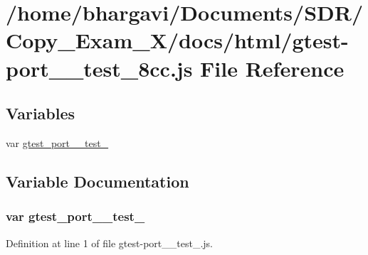 \hypertarget{gtest-port____test__8cc_8js}{}\section{/home/bhargavi/\+Documents/\+S\+D\+R/\+Copy\+\_\+\+Exam\+\_\+X/docs/html/gtest-\/port\+\_\+\+\_\+test\+\_\+8cc.js File Reference}
\label{gtest-port____test__8cc_8js}
\subsection*{Variables}
\begin{DoxyCompactItemize}
\item 
var \hyperlink{gtest-port____test__8cc_8js_a7cd2283c59951c8b18a284be2a49d86d}{gtest\+\_\+port\+\_\+\+\_\+test\+\_}
\end{DoxyCompactItemize}


\subsection{Variable Documentation}
\subsubsection[{\texorpdfstring{gtest\+\_\+port\+\_\+\+\_\+test\+\_\+8cc}{gtest_port__test_8cc}}]{\setlength{\rightskip}{0pt plus 5cm}var gtest\+\_\+port\+\_\+\+\_\+test\+\_}\hypertarget{gtest-port____test__8cc_8js_a7cd2283c59951c8b18a284be2a49d86d}{}\label{gtest-port____test__8cc_8js_a7cd2283c59951c8b18a284be2a49d86d}


Definition at line 1 of file gtest-\/port\+\_\+\+\_\+test\+\_.\+js.

